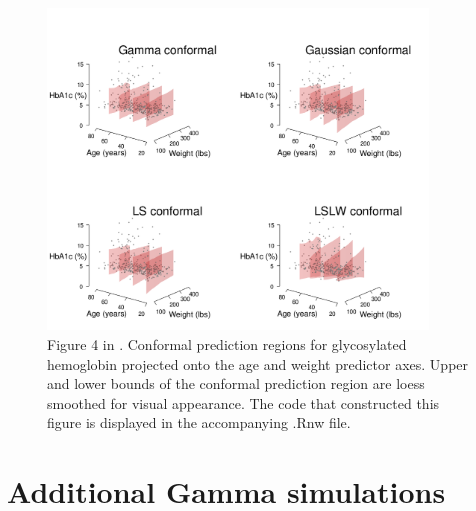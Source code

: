 \documentclass[11pt]{article}\usepackage[]{graphicx}\usepackage[]{color}
\begin{document}
\begin{figure}
\begin{center}

\includegraphics[width=0.9\textwidth]{conformal3ddiabetes.png}
\end{center}
\caption{ 
  Figure 4 in \citet{eck2019conformal}.
  Conformal prediction regions for glycosylated hemoglobin projected onto the 
  age and weight predictor axes.
  Upper and lower bounds of the conformal prediction region are loess smoothed for visual appearance.
  The code that constructed this figure is displayed in the accompanying .Rnw file.
}
\label{Fig:3d-conformal-regions}
\end{figure}




\newpage
\section{Additional Gamma simulations}
\label{sec:Gamma}
\end{document}
